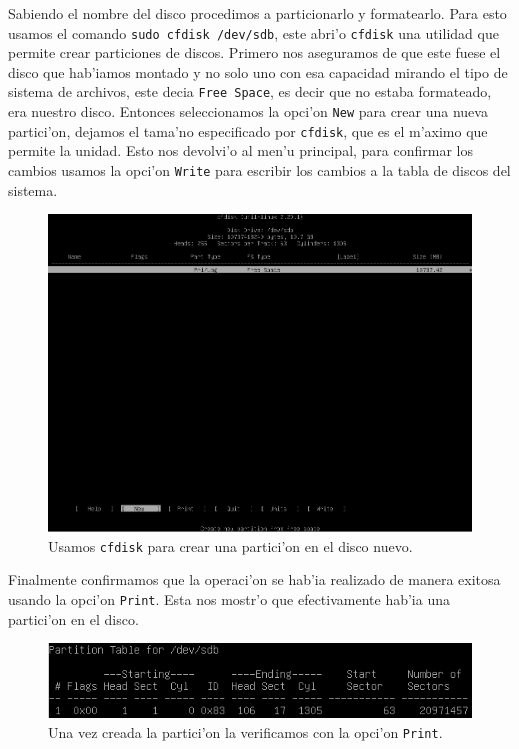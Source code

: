 \documentclass[11pt]{article}
\begin{document}
		Sabiendo el nombre del disco procedimos a particionarlo y formatearlo. Para esto usamos el comando \texttt{sudo cfdisk /dev/sdb}, este abri'o \texttt{cfdisk} una utilidad que permite crear particiones de discos. Primero nos aseguramos de que este fuese el disco que hab'iamos montado y no solo uno con esa capacidad mirando el tipo de sistema de archivos, este decia \texttt{Free Space}, es decir que no estaba formateado, era nuestro disco. Entonces seleccionamos la opci'on \texttt{New} para crear una nueva partici'on, dejamos el tama'no especificado por \texttt{cfdisk}, que es el m'aximo que permite la unidad. Esto nos devolvi'o al men'u principal, para confirmar los cambios usamos la opci'on \texttt{Write} para escribir los cambios a la tabla de discos del sistema. 

		\begin{figure}[H]
    			\centering
    			\includegraphics[scale=0.40]{Images/rsync/rsync_disk_partition.PNG}
    			\caption{Usamos \texttt{cfdisk} para crear una partici'on en el disco nuevo.}
    			\label{fig:rsync_disk_partition}
		\end{figure}

		Finalmente confirmamos que la operaci'on se hab'ia realizado de manera exitosa usando la opci'on \texttt{Print}. Esta nos mostr'o que efectivamente hab'ia una partici'on en el disco.

		\begin{figure}[H]
    			\centering
    			\includegraphics[scale=0.65]{Images/rsync/rsync_disk_table.PNG}
    			\caption{Una vez creada la partici'on la verificamos con la opci'on \texttt{Print}.}
    			\label{fig:rsync_disk_table}
		\end{figure}
\end{document}

